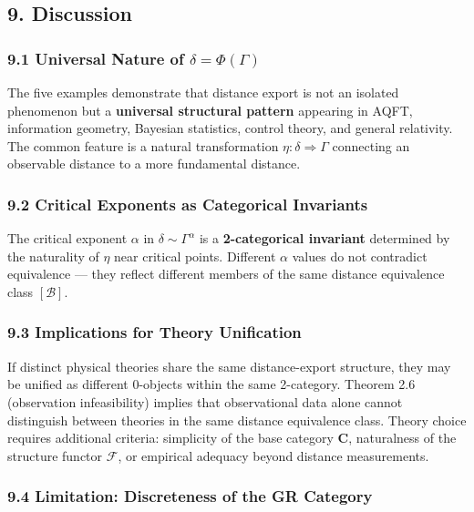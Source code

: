 \documentclass[
]{article}
\begin{document}
\subsection{9. Discussion}\label{discussion}

\subsubsection{\texorpdfstring{9.1 Universal Nature of
\(\delta = \Phi(\Gamma)\)}{9.1 Universal Nature of \textbackslash delta = \textbackslash Phi(\textbackslash Gamma)}}\label{universal-nature-of-delta-phigamma}

The five examples demonstrate that distance export is not an isolated
phenomenon but a \textbf{universal structural pattern} appearing in
AQFT, information geometry, Bayesian statistics, control theory, and
general relativity. The common feature is a natural transformation
\(\eta: \delta \Rightarrow \Gamma\) connecting an observable distance to
a more fundamental distance.

\subsubsection{9.2 Critical Exponents as Categorical
Invariants}\label{critical-exponents-as-categorical-invariants}

The critical exponent \(\alpha\) in \(\delta \sim \Gamma^\alpha\) is a
\textbf{2-categorical invariant} determined by the naturality of
\(\eta\) near critical points. Different \(\alpha\) values do not
contradict equivalence --- they reflect different members of the same
distance equivalence class \([\mathcal{B}]\).

\subsubsection{9.3 Implications for Theory
Unification}\label{implications-for-theory-unification}

If distinct physical theories share the same distance-export structure,
they may be unified as different 0-objects within the same 2-category.
Theorem 2.6 (observation infeasibility) implies that observational data
alone cannot distinguish between theories in the same distance
equivalence class. Theory choice requires additional criteria:
simplicity of the base category \(\mathbf{C}\), naturalness of the
structure functor \(\mathcal{F}\), or empirical adequacy beyond distance
measurements.

\subsubsection{9.4 Limitation: Discreteness of the GR
Category}\label{limitation-discreteness-of-the-gr-category}
\end{document}
